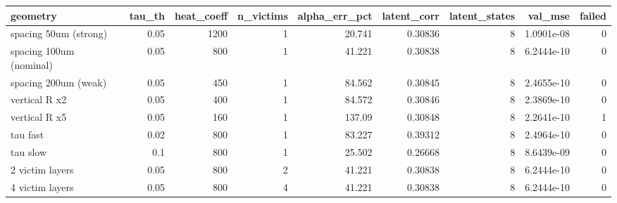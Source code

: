 \begin{tabular}{lrrrrrrrr}
\toprule
geometry & tau_th & heat_coeff & n_victims & alpha_err_pct & latent_corr & latent_states & val_mse & failed \\
\midrule
spacing 50um (strong) & 0.05 & 1200 & 1 & 20.741 & 0.30836 & 8 & 1.0901e-08 & 0 \\
spacing 100um (nominal) & 0.05 & 800 & 1 & 41.221 & 0.30838 & 8 & 6.2444e-10 & 0 \\
spacing 200um (weak) & 0.05 & 450 & 1 & 84.562 & 0.30845 & 8 & 2.4655e-10 & 0 \\
vertical R x2 & 0.05 & 400 & 1 & 84.572 & 0.30846 & 8 & 2.3869e-10 & 0 \\
vertical R x5 & 0.05 & 160 & 1 & 137.09 & 0.30848 & 8 & 2.2641e-10 & 1 \\
tau fast & 0.02 & 800 & 1 & 83.227 & 0.39312 & 8 & 2.4964e-10 & 0 \\
tau slow & 0.1 & 800 & 1 & 25.502 & 0.26668 & 8 & 8.6439e-09 & 0 \\
2 victim layers & 0.05 & 800 & 2 & 41.221 & 0.30838 & 8 & 6.2444e-10 & 0 \\
4 victim layers & 0.05 & 800 & 4 & 41.221 & 0.30838 & 8 & 6.2444e-10 & 0 \\
\bottomrule
\end{tabular}
